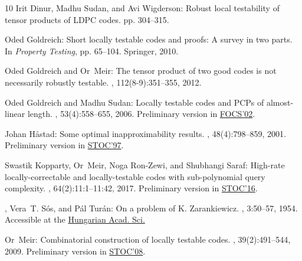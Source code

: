 \documentclass[11pt]{article}
\numberwithin{equation}{section}
\theoremstyle{definition}
\theoremstyle{plain}
\theoremstyle{plain}
\begin{document}
\begin{thebibliography}{10}
{\sc Irit Dinur, Madhu Sudan, and Avi Wigderson}: Robust local testability of
  tensor products of {LDPC} codes.
\newblock pp. 304--315.
\newblock [\epfmtdoi{10.1007/11830924\_29}]

{\sc Oded Goldreich}: Short locally testable codes and proofs: A survey in two
  parts.
\newblock In {\em Property Testing}, pp. 65--104. Springer, 2010.
\newblock [\epfmtdoi{10.1007/978-3-642-16367-8\_6}]

{\sc Oded Goldreich and Or~Meir}: The tensor product of two good codes is not
  necessarily robustly testable.
, 112(8-9):351--355, 2012.

{\sc Oded Goldreich and Madhu Sudan}: Locally testable codes and {PCP}s of
  almost-linear length.
, 53(4):558--655, 2006.
\newblock Preliminary version in
  \href{https://doi.org/10.1109/SFCS.2002.1181878}{FOCS'02}.
\newblock [\epfmtdoi{10.1145/1162349.1162351}]

{\sc Johan H{\aa}stad}: Some optimal inapproximability results.
, 48(4):798--859, 2001.
\newblock Preliminary version in
  \href{https://doi.org/10.1145/258533.258536}{STOC'97}.
\newblock [\epfmtdoi{10.1145/502090.502098}]

{\sc Swastik Kopparty, Or~Meir, Noga {Ron-Zewi}, and Shubhangi Saraf}:
  High-rate locally-correctable and locally-testable codes with sub-polynomial
  query complexity.
, 64(2):11:1--11:42, 2017.
\newblock Preliminary version in
  \href{https://doi.org/10.1145/2897518.2897523}{STOC'16}.

{, Vera~T. S\'{o}s, and
  P\'{a}l Tur\'{a}n}: On a problem of {K.} {Z}arankiewicz.
, 3:50--57, 1954.
\newblock Accessible at the
  \href{http://real.mtak.hu/110431/1/cm3110.pdf}{Hungarian Acad. Sci.}

{\sc Or~Meir}: Combinatorial construction of locally testable codes.
, 39(2):491--544, 2009.
\newblock Preliminary version in
  \href{https://doi.org/10.1145/1374376.1374419}{STOC'08}.
\newblock [\epfmtdoi{10.1137/080729967}]


\end{thebibliography}
\end{document}
